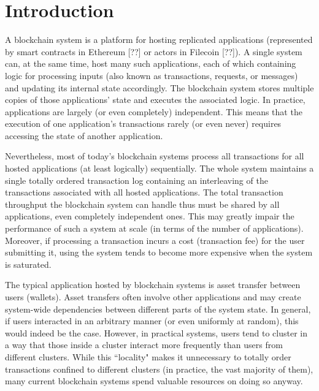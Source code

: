 \section{Introduction}
\label{sec:introduction}

A blockchain system is a platform for hosting replicated applications (represented by smart contracts in Ethereum [??] or actors in Filecoin [??]).
A single system can, at the same time, host many such applications,
each of which containing logic for processing inputs (also known as transactions, requests, or messages) and updating its internal state accordingly.
The blockchain system stores multiple copies of those applications' state and executes the associated logic.
In practice, applications are largely (or even completely) independent.
This means that the execution of one application's transactions rarely (or even never) requires accessing the state of another application.

Nevertheless, most of today's blockchain systems process all transactions for all hosted applications (at least logically) sequentially.
The whole system maintains a single totally ordered transaction log containing an interleaving of the transactions associated with all hosted applications.
The total transaction throughput the blockchain system can handle thus must be shared by all applications, even completely independent ones.
This may greatly impair the performance of such a system at scale (in terms of the number of applications).
Moreover, if processing a transaction incurs a cost (transaction fee) for the user submitting it, using the system tends to become more expensive when the system is saturated.

The typical application hosted by blockchain systems is asset transfer between users (wallets).
Asset transfers often involve other applications and may create system-wide dependencies between different parts of the system state.
In general, if users interacted in an arbitrary manner (or even uniformly at random), this would indeed be the case.
However, in practical systems, users tend to cluster in a way that those inside a cluster interact more frequently than users from different clusters.
While this ``locality" makes it unnecessary to totally order transactions confined to different clusters (in practice, the vast majority of them),
many current blockchain systems spend valuable resources on doing so anyway.

